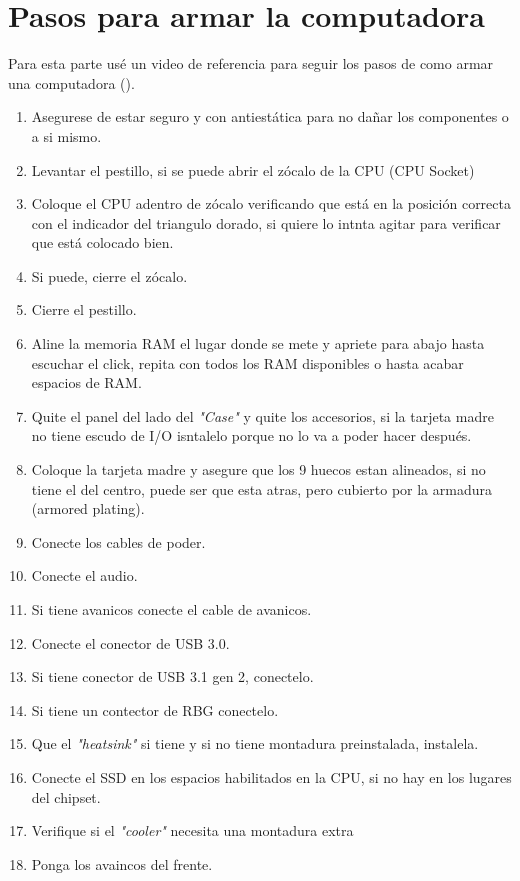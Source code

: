 \documentclass[12pt, a4paper]{article}
\begin{document}
\section{Pasos para armar la computadora}
Para esta parte usé un video de referencia para seguir los pasos de como armar una computadora (\cite{linusTechTips_pcbuildingGuide}).
\begin{enumerate}
    \item Asegurese de estar seguro y con antiestática para no dañar los componentes o a si mismo.
    \item Levantar el pestillo, si se puede abrir el zócalo de la CPU (CPU Socket)
    \item Coloque el CPU adentro de zócalo verificando que está en la posición correcta con el indicador del triangulo dorado, si quiere lo intnta agitar para verificar que está colocado bien.
    \item Si puede, cierre el zócalo.
    \item Cierre el pestillo.
    \item Aline la memoria RAM el lugar donde se mete y apriete para abajo hasta escuchar el click, repita con todos los RAM disponibles o hasta acabar espacios de RAM.
    \item Quite el panel del lado del \textit{"Case"} y quite los accesorios, si la tarjeta madre no tiene escudo de I/O isntalelo porque no lo va a poder hacer después.
    \item Coloque la tarjeta madre y asegure que los 9 huecos estan alineados, si no tiene el del centro, puede ser que esta atras, pero cubierto por la armadura (armored plating).
    \item Conecte los cables de poder.
    \item Conecte el audio.
    \item Si tiene avanicos conecte el cable de avanicos.
    \item Conecte el conector de USB 3.0.
    \item Si tiene conector de USB 3.1 gen 2, conectelo.
    \item Si tiene un contector de RBG conectelo.
    \item Que el \textit{"heatsink"} si tiene y si no tiene montadura preinstalada, instalela.
    \item Conecte el SSD en los espacios habilitados en la CPU, si no hay en los lugares del chipset.
    \item Verifique si el \textit{"cooler"} necesita una montadura extra
    \item Ponga los avaincos del frente.

\end{enumerate}
\end{document}
